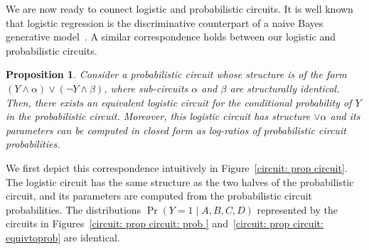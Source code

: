 \documentclass[letterpaper]{article} %
\newtheorem{proposition}[corollary]{Proposition}
\begin{document}
We are now ready to connect logistic and probabilistic circuits. It is well known that logistic regression is the discriminative counterpart of a naive Bayes generative model~\cite{ng2002discriminative}. A similar correspondence holds between our logistic and probabilistic circuits.
\begin{proposition}
\label{prop: correspondence}
Consider a probabilistic circuit whose structure is of the form $(Y \land \alpha) \lor (\neg Y \land \beta)$, where sub-circuits $\alpha$ and $\beta$ are structurally identical.
Then, there exists an equivalent logistic circuit for the conditional probability of $Y$ in the probabilistic circuit. Moreover, this logistic circuit has structure $\lor \alpha$ and its parameters can be computed in closed form as log-ratios of probabilistic circuit probabilities.
\end{proposition}

We first depict this correspondence intuitively in Figure~\ref{circuit: prop circuit}. The logistic circuit has the same structure as the two halves of the probabilistic circuit, and its parameters are computed from the probabilistic circuit probabilities. The distributions $\Pr(Y=1 \mid A,B,C,D)$ represented by the circuits in Figures~\ref{circuit: prop circuit: prob } and~\ref{circuit: prop circuit: equivtoprob} are identical. 
\end{document}
